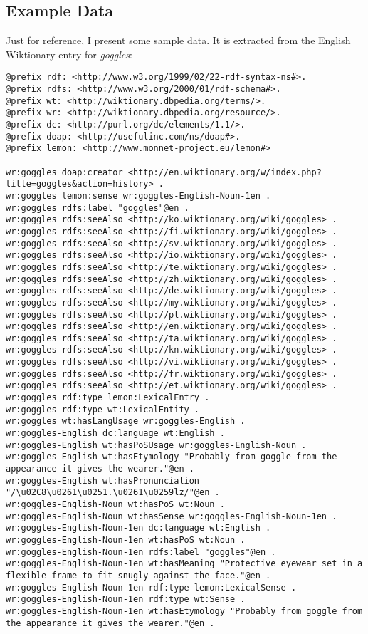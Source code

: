\subsection{Example Data}
Just for reference, I present some sample data. It is extracted from the English Wiktionary entry for \textit{goggles}:
\begin{lstlisting}
@prefix rdf: <http://www.w3.org/1999/02/22-rdf-syntax-ns#>.
@prefix rdfs: <http://www.w3.org/2000/01/rdf-schema#>.
@prefix wt: <http://wiktionary.dbpedia.org/terms/>.
@prefix wr: <http://wiktionary.dbpedia.org/resource/>.
@prefix dc: <http://purl.org/dc/elements/1.1/>.
@prefix doap: <http://usefulinc.com/ns/doap#>.
@prefix lemon: <http://www.monnet-project.eu/lemon#>

wr:goggles doap:creator <http://en.wiktionary.org/w/index.php?title=goggles&action=history> . 
wr:goggles lemon:sense wr:goggles-English-Noun-1en . 
wr:goggles rdfs:label "goggles"@en . 
wr:goggles rdfs:seeAlso <http://ko.wiktionary.org/wiki/goggles> . 
wr:goggles rdfs:seeAlso <http://fi.wiktionary.org/wiki/goggles> . 
wr:goggles rdfs:seeAlso <http://sv.wiktionary.org/wiki/goggles> . 
wr:goggles rdfs:seeAlso <http://io.wiktionary.org/wiki/goggles> . 
wr:goggles rdfs:seeAlso <http://te.wiktionary.org/wiki/goggles> . 
wr:goggles rdfs:seeAlso <http://zh.wiktionary.org/wiki/goggles> . 
wr:goggles rdfs:seeAlso <http://de.wiktionary.org/wiki/goggles> . 
wr:goggles rdfs:seeAlso <http://my.wiktionary.org/wiki/goggles> . 
wr:goggles rdfs:seeAlso <http://pl.wiktionary.org/wiki/goggles> . 
wr:goggles rdfs:seeAlso <http://en.wiktionary.org/wiki/goggles> . 
wr:goggles rdfs:seeAlso <http://ta.wiktionary.org/wiki/goggles> . 
wr:goggles rdfs:seeAlso <http://kn.wiktionary.org/wiki/goggles> . 
wr:goggles rdfs:seeAlso <http://vi.wiktionary.org/wiki/goggles> . 
wr:goggles rdfs:seeAlso <http://fr.wiktionary.org/wiki/goggles> . 
wr:goggles rdfs:seeAlso <http://et.wiktionary.org/wiki/goggles> . 
wr:goggles rdf:type lemon:LexicalEntry . 
wr:goggles rdf:type wt:LexicalEntity . 
wr:goggles wt:hasLangUsage wr:goggles-English . 
wr:goggles-English dc:language wt:English . 
wr:goggles-English wt:hasPoSUsage wr:goggles-English-Noun . 
wr:goggles-English wt:hasEtymology "Probably from goggle from the appearance it gives the wearer."@en . 
wr:goggles-English wt:hasPronunciation "/\u02C8\u0261\u0251.\u0261\u0259lz/"@en . 
wr:goggles-English-Noun wt:hasPoS wt:Noun . 
wr:goggles-English-Noun wt:hasSense wr:goggles-English-Noun-1en . 
wr:goggles-English-Noun-1en dc:language wt:English . 
wr:goggles-English-Noun-1en wt:hasPoS wt:Noun . 
wr:goggles-English-Noun-1en rdfs:label "goggles"@en . 
wr:goggles-English-Noun-1en wt:hasMeaning "Protective eyewear set in a flexible frame to fit snugly against the face."@en . 
wr:goggles-English-Noun-1en rdf:type lemon:LexicalSense . 
wr:goggles-English-Noun-1en rdf:type wt:Sense . 
wr:goggles-English-Noun-1en wt:hasEtymology "Probably from goggle from the appearance it gives the wearer."@en . 
\end{lstlisting}

